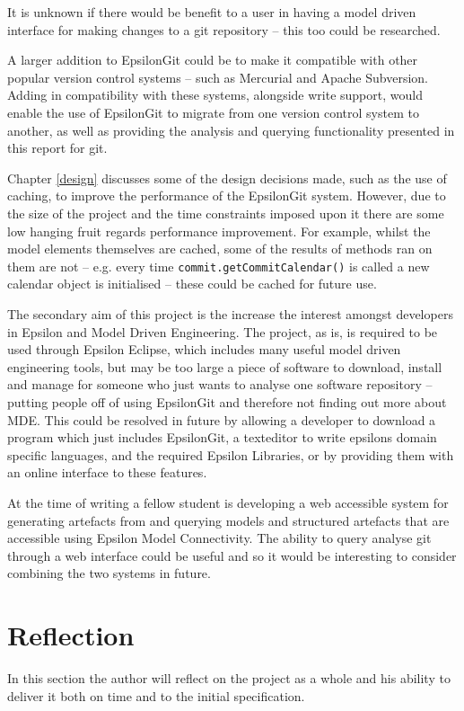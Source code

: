 \documentclass[11pt]{book}
\newcommand{\code}[1]{\texttt{#1}}
\begin{document}
It is unknown if there would be benefit to a user in having a model driven interface for making changes to a git repository -- this too could be researched. 

A larger addition to EpsilonGit could be to make it compatible with other popular version control systems -- such as Mercurial and Apache Subversion. Adding in compatibility with these systems, alongside write support, would enable the use of EpsilonGit to migrate from one version control system to another, as well as providing the analysis and querying functionality presented in this report for git.

Chapter \ref{design} discusses some of the design decisions made, such as the use of caching, to improve the performance of the EpsilonGit system. However, due to the size of the project and the time constraints imposed upon it there are some low hanging fruit regards performance improvement. For example, whilst the model elements themselves are cached, some of the results of methods ran on them are not -- e.g. every time \code{commit.getCommitCalendar()} is called a new calendar object is initialised -- these could be cached for future use.

The secondary aim of this project is the increase the interest amongst developers in Epsilon and Model Driven Engineering. The project, as is, is required to be used through Epsilon Eclipse, which includes many useful model driven engineering tools, but may be too large a piece of software to download, install and manage for someone who just wants to analyse one software repository -- putting people off of using EpsilonGit and therefore not finding out more about MDE. This could be resolved in future by allowing a developer to download a program which just includes EpsilonGit, a texteditor to write epsilons domain specific languages, and the required Epsilon Libraries, or by providing them with an online interface to these features.

At the time of writing a fellow student is developing a web accessible system for generating artefacts from and querying models and structured artefacts that are accessible using Epsilon Model Connectivity. The ability to query analyse git through a web interface could be useful and so it would be interesting to consider combining the two systems in future.

\section{Reflection}
In this section the author will reflect on the project as a whole and his ability to deliver it both on time and to the initial specification.
\end{document}
